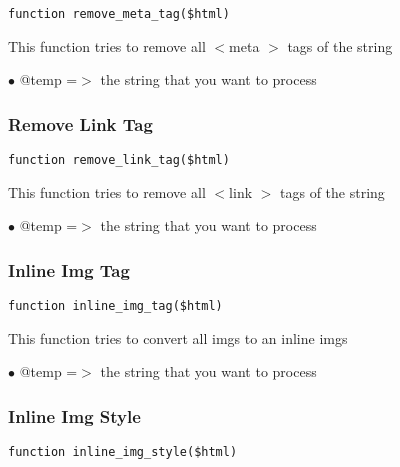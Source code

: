\documentclass[a4paper]{article}
\begin{document}
\begin{lstlisting}
function remove_meta_tag($html)
\end{lstlisting}

This function tries to remove all $<$meta $>$ tags of the string

\begin{compactitem}
\item[\color{myblue}$\bullet$] @temp =$>$ the string that you want to process
\end{compactitem}

\hypertarget{toc113}{}
\subsubsection{Remove Link Tag}

\begin{lstlisting}
function remove_link_tag($html)
\end{lstlisting}

This function tries to remove all $<$link $>$ tags of the string

\begin{compactitem}
\item[\color{myblue}$\bullet$] @temp =$>$ the string that you want to process
\end{compactitem}

\hypertarget{toc114}{}
\subsubsection{Inline Img Tag}

\begin{lstlisting}
function inline_img_tag($html)
\end{lstlisting}

This function tries to convert all imgs to an inline imgs

\begin{compactitem}
\item[\color{myblue}$\bullet$] @temp =$>$ the string that you want to process
\end{compactitem}

\hypertarget{toc115}{}
\subsubsection{Inline Img Style}

\begin{lstlisting}
function inline_img_style($html)
\end{lstlisting}
\end{document}
